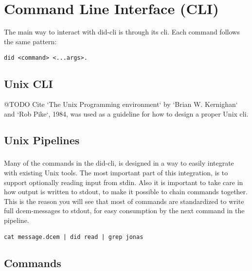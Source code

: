 \chapter{Command Line Interface (CLI)}

The main way to interact with \acrshort{did-cli} is through its \acrfull{cli}. Each command follows the same pattern:


\begin{lstlisting}
did <command> <...args>.
\end{lstlisting}


\section{Unix CLI}

@TODO Cite `The Unix Programming environment` by `Brian W. Kernighan` and `Rob Pike`, 1984, was used as a guideline for how to design a proper Unix \acrshort{cli}.



\section{Unix Pipelines}

\paragraph{}
Many of the commands in the \acrshort{did-cli}, is designed in a way to easily integrate with existing Unix tools. The most important part of this integration, is to support optionally reading input from \acrfull{stdin}. Also it is important to take care in how output is written to \acrfull{stdout}, to make it possible to chain commands together. This is the reason you will see that most of commands are standardized to write full \acrshort{dcem}-messages to \acrshort{stdout}, for easy consumption by the next command in the pipeline.


\begin{lstlisting}
cat message.dcem | did read | grep jonas 
\end{lstlisting}

\newpage

\section{Commands}



